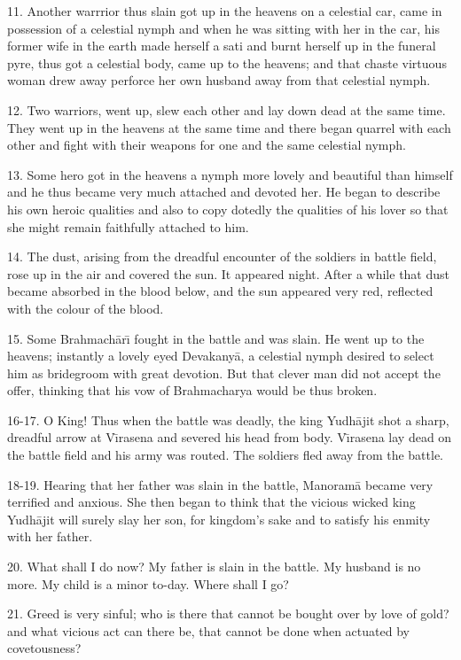 11. Another warrrior thus slain got up in the heavens on a celestial car, came in possession of a celestial nymph and when he was sitting with her in the car, his former wife in the earth made herself a sati and burnt herself up in the funeral pyre, thus got a celestial body, came up to the heavens; and that chaste virtuous woman drew away perforce her own husband away from that celestial nymph.

12. Two warriors, went up, slew each other and lay down dead at the same time. They went up in the heavens at the same time and there began quarrel with each other and fight with their weapons for one and the same celestial nymph.

13. Some hero got in the heavens a nymph more lovely and beautiful than himself and he thus became very much attached and devoted her. He began to describe his own heroic qualities and also to copy dotedly the qualities of his lover so that she might remain faithfully attached to him.

14. The dust, arising from the dreadful encounter of the soldiers in battle field, rose up in the air and covered the sun. It appeared night. After a while that dust became absorbed in the blood below, and the sun appeared very red, reflected with the colour of the blood.

15. Some Brahmach\=ar\={\i} fought in the battle and was slain. He went up to the heavens; instantly a lovely eyed Devakany\=a, a celestial nymph desired to select him as bridegroom with great devotion. But that clever man did not accept the offer, thinking that his vow of Brahmacharya would be thus broken.

16-17. O King! Thus when the battle was deadly, the king Yudh\=ajit shot a sharp, dreadful arrow at V\={\i}rasena and severed his head from body. V\={\i}rasena lay dead on the battle field and his army was routed. The soldiers fled away from the battle.

18-19. Hearing that her father was slain in the battle, Manoram\=a became very terrified and anxious. She then began to think that the vicious wicked king Yudh\=ajit will surely slay her son, for kingdom's sake and to satisfy his enmity with her father.

20. What shall I do now? My father is slain in the battle. My husband is no more. My child is a minor to-day. Where shall I go?

21. Greed is very sinful; who is there that cannot be bought over by love of gold? and what vicious act can there be, that cannot be done when actuated by covetousness?


